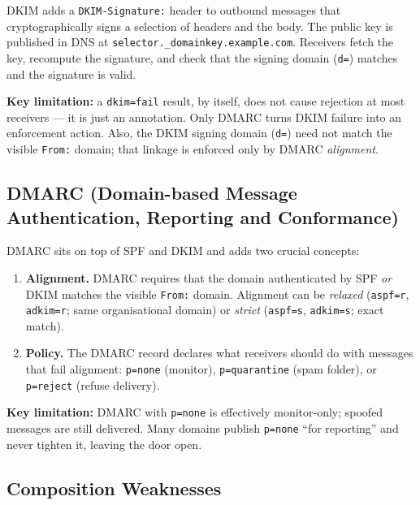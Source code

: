 \documentclass[11pt]{article}
\begin{document}
DKIM adds a \texttt{DKIM-Signature:} header to outbound messages that
cryptographically signs a selection of headers and the body.
The public key is published in DNS at
\texttt{selector.\_domainkey.example.com}.
Receivers fetch the key, recompute the signature, and check that the
signing domain (\texttt{d=}) matches and the signature is valid.

\begin{infobox}
\textbf{Key limitation:} a \texttt{dkim=fail} result, by itself, does
not cause rejection at most receivers --- it is just an annotation. Only
DMARC turns DKIM failure into an enforcement action. Also, the DKIM
signing domain (\texttt{d=}) need not match the visible \texttt{From:}
domain; that linkage is enforced only by DMARC \emph{alignment}.
\end{infobox}

\subsection{DMARC (Domain-based Message Authentication, Reporting and
Conformance)}

DMARC sits on top of SPF and DKIM and adds two crucial concepts:

\begin{enumerate}[noitemsep]
  \item \textbf{Alignment.} DMARC requires that the domain authenticated
        by SPF \emph{or} DKIM matches the visible \texttt{From:} domain.
        Alignment can be \emph{relaxed} (\texttt{aspf=r},
        \texttt{adkim=r}; same organisational domain) or
        \emph{strict} (\texttt{aspf=s}, \texttt{adkim=s}; exact match).
  \item \textbf{Policy.} The DMARC record declares what receivers should
        do with messages that fail alignment: \texttt{p=none}
        (monitor), \texttt{p=quarantine} (spam folder), or
        \texttt{p=reject} (refuse delivery).
\end{enumerate}

\begin{infobox}
\textbf{Key limitation:} DMARC with \texttt{p=none} is effectively
monitor-only; spoofed messages are still delivered. Many domains
publish \texttt{p=none} ``for reporting'' and never tighten it,
leaving the door open.
\end{infobox}

\subsection{Composition Weaknesses}
\end{document}
